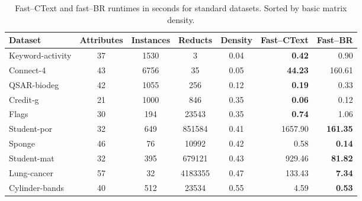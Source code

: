\documentclass[citeauthoryear]{llncs}
\begin{document}
	\begin{table}[htb]
		\centering \footnotesize
		\caption{Fast--CText and fast--BR runtimes in seconds for standard datasets. Sorted by basic matrix density.}
		\label{tab:density}
		\begin{tabular}{lccccrr}
			\hline
			Dataset   		 & Attributes & Instances & Reducts  & Density & Fast--CText      & Fast--BR        \\
			\hline
			Keyword-activity & 37         & 1530      & 3        & 0.04    & \textbf{0.42}    & 0.90            \\
			Connect-4        & 43         & 6756      & 35       & 0.05    & \textbf{44.23}   & 160.61          \\
			QSAR-biodeg      & 42         & 1055      & 256      & 0.12    & \textbf{0.19}    & 0.33            \\
			Credit-g         & 21         & 1000      & 846      & 0.35    & \textbf{0.06}    & 0.12            \\
			Flags            & 30         & 194       & 23543    & 0.35    & \textbf{0.74}    & 1.06            \\
			Student-por      & 32         & 649       & 851584   & 0.41    & 1657.90          & \textbf{161.35} \\
			Sponge           & 46         & 76        & 10992    & 0.42    & 0.58             & \textbf{0.14}   \\
			Student-mat      & 32         & 395       & 679121   & 0.43    & 929.46           & \textbf{81.82}  \\
			Lung-cancer      & 57         & 32        & 4183355  & 0.47    & 133.43           & \textbf{7.34}   \\
			Cylinder-bands   & 40         & 512       & 23534    & 0.55    & 4.59             & \textbf{0.53}   \\
			\hline
		\end{tabular}
	\end{table}
%
%
\end{document}
